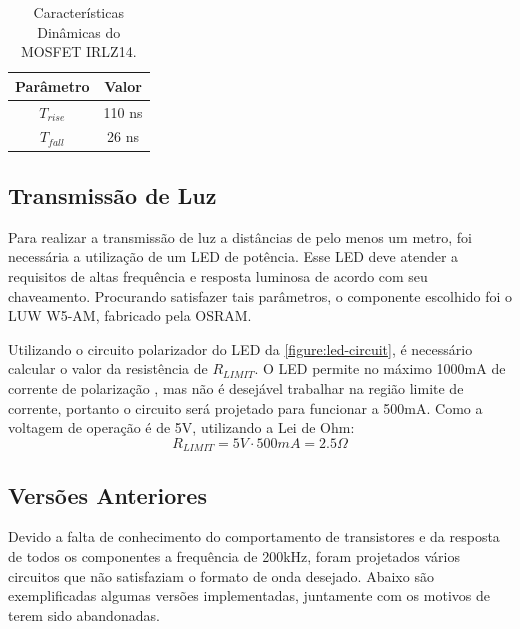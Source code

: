 	\begin{table}[h]
		\caption{Características Dinâmicas do MOSFET IRLZ14.}
		\centering
		\begin{tabular}{c c}
			\hline
			Parâmetro  & Valor  \\ \hline
			$T_{rise}$ & 110 ns \\
			$T_{fall}$ & 26 ns  \\ \hline
		\end{tabular}
		\label{table:irlz14-timing}
	\end{table}

	\subsection{Transmissão de Luz}

	Para realizar a transmissão de luz a distâncias de pelo menos um metro, foi necessária a utilização de um LED de potência. Esse LED deve atender a requisitos de altas frequência e resposta luminosa de acordo com seu chaveamento. Procurando satisfazer tais parâmetros, o componente escolhido foi o LUW W5-AM, fabricado pela OSRAM.

	Utilizando o circuito polarizador do LED da \autoref{figure:led-circuit}, é necessário calcular o valor da resistência de $R_{LIMIT}$. O LED permite no máximo 1000mA de corrente de polarização \cite{datasheet-luw-w5am}, mas não é desejável trabalhar na região limite de corrente, portanto o circuito será projetado para funcionar a 500mA. Como a voltagem de operação é de 5V, utilizando a Lei de Ohm:
	\begin{equation}
	R_{LIMIT} = 5V \cdot 500mA = 2.5\Omega
	\end{equation}

	\subsection{Versões Anteriores}

	Devido a falta de conhecimento do comportamento de transistores e da resposta de todos os componentes a frequência de 200kHz, foram projetados vários circuitos que não satisfaziam o formato de onda desejado. Abaixo são exemplificadas algumas versões implementadas, juntamente com os motivos de terem sido abandonadas.

